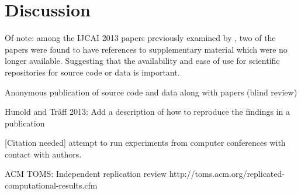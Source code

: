 
\chapter{Discussion}

Of note: among the IJCAI 2013 papers previously examined by \cite{Gundersen2015}, two of the papers were found to have references to supplementary material which were no longer available. Suggesting that the availability and ease of use for scientific repositories for source code or data is important.

Anonymous publication of source code and data along with papers (blind review)

Hunold and Träff 2013: Add a description of how to reproduce the findings in a publication

[Citation needed] attempt to run experiments from computer conferences with contact with authors.

ACM TOMS: Independent replication review http://toms.acm.org/replicated-computational-results.cfm

\cleardoublepage
